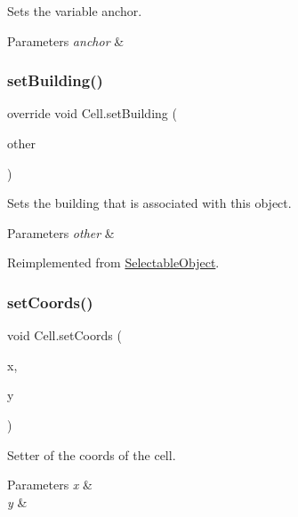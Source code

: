 Sets the variable anchor. 


\begin{DoxyParams}{Parameters}
{\em anchor} & \\
\hline
\end{DoxyParams}
\mbox{\label{class_cell_a415c2fd77ec3b53bed8115fddd311a6f}} 
\subsubsection{\texorpdfstring{set\+Building()}{setBuilding()}}
{\footnotesize\ttfamily override void Cell.\+set\+Building (\begin{DoxyParamCaption}\item[{\mbox{\hyperlink{class_selectable_object}{Selectable\+Object}}}]{other }\end{DoxyParamCaption})\hspace{0.3cm}{\ttfamily [virtual]}}



Sets the building that is associated with this object. 


\begin{DoxyParams}{Parameters}
{\em other} & \\
\hline
\end{DoxyParams}


Reimplemented from \mbox{\hyperlink{class_selectable_object_a3817f94af010c5cc5d2967a145b39f21}{Selectable\+Object}}.

\mbox{\label{class_cell_a2943d1c01e920a04f78bd48bbb1db9b1}} 
\subsubsection{\texorpdfstring{set\+Coords()}{setCoords()}}
{\footnotesize\ttfamily void Cell.\+set\+Coords (\begin{DoxyParamCaption}\item[{int}]{x,  }\item[{int}]{y }\end{DoxyParamCaption})}



Setter of the coords of the cell. 


\begin{DoxyParams}{Parameters}
{\em x} & \\
\hline
{\em y} & \\
\hline
\end{DoxyParams}
\mbox{\label{class_cell_a901695c1fdd8d8dde6601cbe60a19f6c}} 
